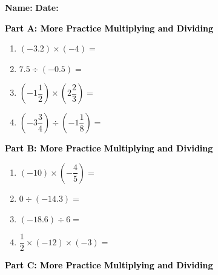 \documentclass[12pt, letterpaper, fleqn]{article}
\begin{document}
\textbf{Name:} \underline{\hspace{5cm}}
\hfill
\textbf{Date:} \underline{\hspace{3cm}}\\

\begin{tcolorbox}[colback=customteal!20]
\large\textcolor{black}{\textbf{Part A: More Practice Multiplying and Dividing}}
\end{tcolorbox}

\vspace{3mm}

\begin{enumerate}[itemsep=4.2cm, leftmargin=0.6cm]
\item $(-3.2) \times (-4) =$
\item $7.5 \div (-0.5) =$
\item $\left(-1\dfrac{1}{2}\right) \times \left(2\dfrac{2}{3}\right) =$
\item $\left(-3\dfrac{3}{4}\right) \div \left(-1\dfrac{1}{8}\right) =$
\end{enumerate}

\newpage

\begin{tcolorbox}[colback=customteal!20]
\large\textcolor{black}{\textbf{Part B: More Practice Multiplying and Dividing}}
\end{tcolorbox}

\vspace{3mm}

\begin{enumerate}[itemsep=4.2cm, leftmargin=0.6cm, resume]
\item $(-10) \times \left(-\dfrac{4}{5}\right) =$
\item $0 \div (-14.3) =$
\item $(-18.6) \div 6 =$
\item $\dfrac{1}{2} \times \left(-12\right) \times \left(-3\right) =$
\end{enumerate}

\newpage

\begin{tcolorbox}[colback=customteal!20]
\large\textcolor{black}{\textbf{Part C: More Practice Multiplying and Dividing}}
\end{tcolorbox}

\vspace{3mm}
\end{document}
